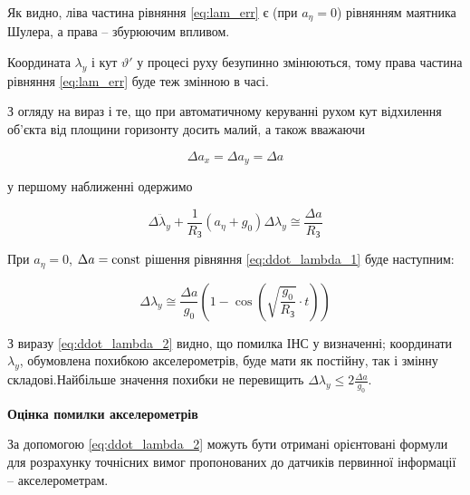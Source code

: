 Як видно, ліва частина рівняння \eqref{eq:lam_err} є (при $a_{\eta } =0$) рівнянням маятника Шулера, а права -- збурюючим впливом.

Координата $\lambda _{y} $ і кут $\vartheta '$ у процесі руху безупинно змінюються, тому права частина рівняння \eqref{eq:lam_err} 
буде теж змінною в часі.

З огляду на вираз і те, що при автоматичному керуванні рухом кут відхилення об'єкта від площини горизонту досить малий, а також вважаючи

\[\Delta a_{x} =\Delta a_{y} =\Delta a\] 

у першому наближенні одержимо

\begin{equation} 
\label{eq:ddot_lambda_1} 
\Delta \ddot{\lambda }_{y} +\frac{1}{R_{{\text{З}}} } (a_{\eta } +g_{0} )\Delta \lambda _{y} \cong \frac{\Delta a}{R_{{\text{З}}} }  
\end{equation} 

При $a_{\eta } =0$, $\Delta a={\rm const}$ рішення рівняння \eqref{eq:ddot_lambda_1} буде наступним:

\begin{equation} 
\label{eq:ddot_lambda_2} 
\Delta \lambda _{y} \cong \frac{\Delta a}{g_{0} } \left(1-\cos \left(\sqrt{\frac{g_{0} }{R_{{\text{З}}} } } \cdot t\right)\right) 
\end{equation} 

З виразу \eqref{eq:ddot_lambda_2} видно, що помилка ІНС у визначенні; координати $\lambda _{y} $, обумовлена похибкою акселерометрів, 
буде мати як постійну, так і змінну складові.Найбільше значення похибки не перевищить  $\Delta \lambda _{y} \le 2\frac{\Delta a}{g_{0} } $. 




\textbf{Оцінка помилки акселерометрів}

За допомогою \eqref{eq:ddot_lambda_2} можуть бути отримані орієнтовані формули для розрахунку точнісних вимог пропонованих до датчиків первинної 
інформації -- акселерометрам.

